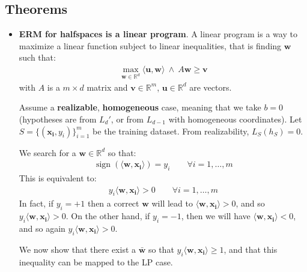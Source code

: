 \documentclass[../template.tex]{subfiles}
\begin{document}
\subsection{Theorems}

\begin{itemize}
    \item \textbf{ERM for halfspaces is a linear program}. 
A linear program is a way to maximize a linear function subject to linear inequalities, that is finding $\bm{w}$ such that:
\begin{align*}
    \max_{\bm{w} \in \mathbb{R}^d} \langle \bm{u}, \bm{w} \rangle \> \land  \> A \bm{w} \geq \bm{v}
\end{align*}
with $A$ is a $m\times d$ matrix and $\bm{v}\in \mathbb{R}^m$, $\bm{u} \in \mathbb{R}^d$ are vectors.
    
Assume a \textbf{realizable}, \textbf{homogeneous} case, meaning that we take $b = 0$ (hypotheses are from $L_d'$, or from $L_{d-1}$ with homogeneous coordinates). Let $S = \{(\bm{x_i}, y_i)\}_{i=1}^m$ be the training dataset. From realizability, $L_S(h_S) = 0$. 

We search for a $\bm{w} \in \mathbb{R}^d$ so that:
\begin{align*}
    \operatorname{sign}(\langle \bm{w}, \bm{x_i} \rangle) = y_i \qquad \forall i = 1, \dots, m
\end{align*}
This is equivalent to:
\begin{align*}
    y_i \langle \bm{w}, \bm{x_i} \rangle > 0 \qquad \forall i = 1, \dots, m
\end{align*}
In fact, if $y_i = +1$ then a correct $\bm{w}$ will lead to $\langle \bm{w}, \bm{x_i} \rangle > 0$, and so $y_i \langle \bm{w}, \bm{x_i} \rangle > 0$. On the other hand, if $y_i = -1$, then we will have $\langle \bm{w}, \bm{x_i} \rangle < 0$, and so again $y_i \langle \bm{w}, \bm{x_i} \rangle > 0$.

We now show that there exist a $\bar{\bm{w}}$ so that $y_i \langle \bm{w}, \bm{x_i} \rangle \geq 1$, and that this inequality can be mapped to the LP case.


\end{itemize}
\end{document}
